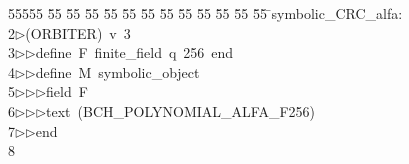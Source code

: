 %
%
\begin{tabbing}
55555 \= 55 \= 55 \= 55 \= 55 \= 55 \= 55 \= 55 \= 55 \= 55 \= 55 \= 55 \= 55 \= \>symbolic\_CRC\_alfa:\\[0pt]
2\>$\triangleright$\>(ORBITER)\ v\ 3\ \\[0pt]
3\>$\triangleright$\>$\triangleright$\>define\ F\ finite\_field\ q\ 256\ end\ \\[0pt]
4\>$\triangleright$\>$\triangleright$\>define\ M\ symbolic\_object\ \\[0pt]
5\>$\triangleright$\>$\triangleright$\>$\triangleright$\>field\ F\ \\[0pt]
6\>$\triangleright$\>$\triangleright$\>$\triangleright$\>text\ (BCH\_POLYNOMIAL\_ALFA\_F256)\ \\[0pt]
7\>$\triangleright$\>$\triangleright$\>end\ \\[0pt]
8\>\end{tabbing}
